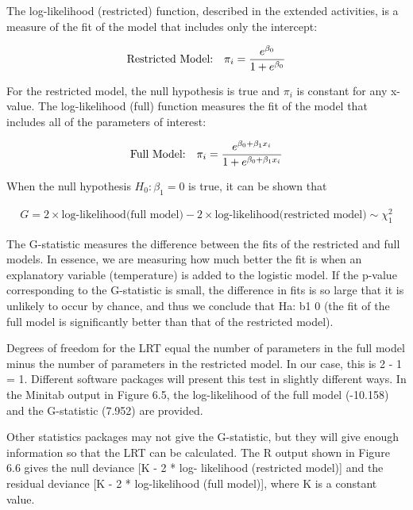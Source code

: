 \documentclass[
]{book}
\begin{document}
The log-likelihood (restricted) function, described in the extended activities, is a measure of the fit of the model that includes only the intercept:

\begin{align}
\text{Restricted Model:} \quad \pi_i = \frac{e^{\beta_0}}{1 + e^{\beta_0}}
\notag
\end{align}

For the restricted model, the null hypothesis is true and \(\pi_i\) is constant for any x-value. The log-likelihood (full) function measures the fit of the model that includes all of the parameters of interest:

\begin{align}
\text{Full Model:} \quad \pi_i = \frac{e^{\beta_0 + \beta_1 x_i}}{1 + e^{\beta_0 + \beta_1 x_i}}
\notag
\end{align}

When the null hypothesis \(H_0: \beta_1 = 0\) is true, it can be shown that

\begin{align}
G = 2 \times \text{log-likelihood(full model)} - 2 \times \text{log-likelihood(restricted model)} \sim \chi^2_1 
\tag{6.15}
\end{align}

The G-statistic measures the difference between the fits of the restricted and full models. In essence, we are measuring how much better the fit is when an explanatory variable (temperature) is added to the logistic model. If the p-value corresponding to the G-statistic is small, the difference in fits is so large that it is unlikely to occur by chance, and thus we conclude that Ha: b1 0 (the fit of the full model is significantly better than that of the restricted model).

Degrees of freedom for the LRT equal the number of parameters in the full model minus the number of
parameters in the restricted model. In our case, this is 2 - 1 = 1. Different software packages will present this test in slightly different ways. In the Minitab output in Figure 6.5, the log-likelihood of the full model (-10.158) and the G-statistic (7.952) are provided.

Other statistics packages may not give the G-statistic, but they will give enough information so that
the LRT can be calculated. The R output shown in Figure 6.6 gives the null deviance {[}K - 2 * log-
likelihood (restricted model){]} and the residual deviance {[}K - 2 * log-likelihood (full model){]}, where
K is a constant value.
\end{document}
